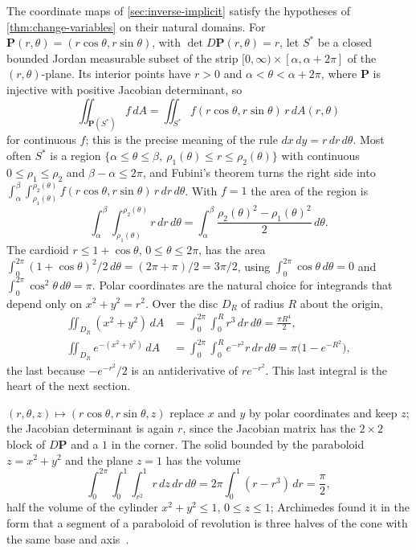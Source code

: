 The coordinate maps of \cref{sec:inverse-implicit} satisfy the hypotheses of \cref{thm:change-variables} on their natural domains. For  $\mathbf P(r,\theta)=(r\cos\theta,r\sin\theta)$, with $\det D\mathbf P(r,\theta)=r$, let $S^*$ be a closed bounded Jordan measurable subset of the strip $[0,\infty)\times[\alpha,\alpha+2\pi]$ of the $(r,\theta)$-plane. Its interior points have $r>0$ and $\alpha<\theta<\alpha+2\pi$, where $\mathbf P$ is injective with positive Jacobian determinant, so
\begin{equation}
\iint_{\mathbf P(S^*)}f\,dA=\iint_{S^*}f(r\cos\theta,r\sin\theta)\,r\,dA(r,\theta)
\label{eq:polar-integral}
\end{equation}
for continuous $f$; this is the precise meaning of the rule $dx\,dy=r\,dr\,d\theta$. Most often $S^*$ is a region $\{\alpha\le\theta\le\beta,\ \rho_1(\theta)\le r\le\rho_2(\theta)\}$ with continuous $0\le\rho_1\le\rho_2$ and $\beta-\alpha\le2\pi$, and Fubini's theorem turns the right side into $\int_\alpha^\beta\int_{\rho_1(\theta)}^{\rho_2(\theta)}f(r\cos\theta,r\sin\theta)\,r\,dr\,d\theta$. With $f=1$ the area of the region is
\[
\int_\alpha^\beta\int_{\rho_1(\theta)}^{\rho_2(\theta)}r\,dr\,d\theta=\int_\alpha^\beta\frac{\rho_2(\theta)^2-\rho_1(\theta)^2}2\,d\theta .
\]
The cardioid $r\le1+\cos\theta$, $0\le\theta\le2\pi$, has the area $\int_0^{2\pi}(1+\cos\theta)^2/2\,d\theta=(2\pi+\pi)/2=3\pi/2$, using $\int_0^{2\pi}\cos\theta\,d\theta=0$ and $\int_0^{2\pi}\cos^2\theta\,d\theta=\pi$. Polar coordinates are the natural choice for integrands that depend only on $x^2+y^2=r^2$. Over the disc $D_R$ of radius $R$ about the origin,
\[
\begin{aligned}
\iint_{D_R}(x^2+y^2)\,dA&=\int_0^{2\pi}\int_0^Rr^3\,dr\,d\theta=\frac{\pi R^4}2,\\
\iint_{D_R}e^{-(x^2+y^2)}\,dA&=\int_0^{2\pi}\int_0^Re^{-r^2}r\,dr\,d\theta=\pi\bigl(1-e^{-R^2}\bigr),
\end{aligned}
\]
the last because $-e^{-r^2}/2$ is an antiderivative of $re^{-r^2}$. This last integral is the heart of the next section.

 $(r,\theta,z)\mapsto(r\cos\theta,r\sin\theta,z)$ replace $x$ and $y$ by polar coordinates and keep $z$; the Jacobian determinant is again $r$, since the Jacobian matrix has the $2\times2$ block of $D\mathbf P$ and a $1$ in the corner. The solid bounded by the paraboloid $z=x^2+y^2$ and the plane $z=1$ has the volume
\[
\int_0^{2\pi}\int_0^1\int_{r^2}^1r\,dz\,dr\,d\theta=2\pi\int_0^1(r-r^3)\,dr=\frac\pi2 ,
\]
half the volume of the cylinder $x^2+y^2\le1$, $0\le z\le1$; Archimedes found it in the form that a segment of a paraboloid of revolution is three halves of the cone with the same base and axis~\cite{heath1897archimedes}.

